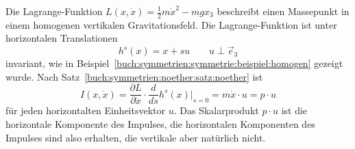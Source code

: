 \begin{beispiel}
\label{buch:symmetrien:noether:beispiel:homogen}
Die Lagrange-Funktion $L(x,\dot{x}) = \frac12m\dot{x}^2-mgx_3$ beschreibt
einen Massepunkt in einem homogenen vertikalen Gravitationsfeld.
Die Lagrange-Funktion ist unter horizontalen Translationen
\[
h^s(x) = x + su\qquad u\perp \vec{e}_3
\]
invariant,
wie in Beispiel~\ref{buch:symmetrien:symmetrie:beispiel:homogen} 
gezeigt wurde.
Nach Satz~\ref{buch:symmetrien:noether:satz:noether} ist 
\[
I(x,\dot{x})
=
\frac{\partial L}{\partial \dot{x}}\cdot \frac{d}{ds} h^s(x)
\bigg|_{s=0}
=
m\dot{x}
\cdot
u
=
p\cdot u
\]
für jeden horizontalten Einheitsvektor $u$.
Das Skalarprodukt $p\cdot u$ ist die horizontale Komponente des Impulses,
%
die horizontalen Komponenten des Impulses sind also erhalten, die
vertikale aber natürlich nicht.
\end{beispiel}

